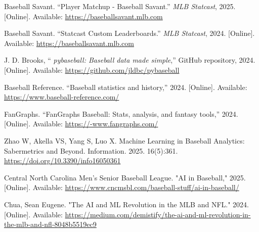 \documentclass[conference]{IEEEtran}
\begin{document}




\begin{thebibliography}{00}

 Baseball Savant. “Player Matchup - Baseball Savant.” \textit{MLB Statcast}, 2025. [Online]. Available: \url{https://baseballsavant.mlb.com}

 Baseball Savant. “Statcast Custom Leaderboards.” \textit{MLB Statcast}, 2024. [Online]. Available: \url{https://baseballsavant.mlb.com}

 J. D. Brooks, “
\textit{pybaseball: Baseball data made simple},” GitHub repository, 2024. [Online]. Available: 
\url{https://github.com/jldbc/pybaseball}

 Baseball Reference. “Baseball statistics and history,” 2024. [Online]. Available: \url{https://www.baseball-reference.com/}

 FanGraphs. “FanGraphs Baseball: Stats, analysis, and fantasy tools,” 2024. [Online]. Available: \url{https://-www.fangraphs.com/}

 Zhao W, Akella VS, Yang S, Luo X. Machine Learning in Baseball Analytics: Sabermetrics and Beyond. Information. 2025. 16(5):361. \url{https://doi.org/10.3390/info16050361}

 Central North Carolina Men's Senior Baseball League. "AI in Baseball," 2025. [Online]. Available: \url{https://www.cncmsbl.com/baseball-stuff/ai-in-baseball/}

 Chua, Sean Eugene. "The AI and ML Revolution in the MLB and NFL." 2024. [Online]. Available: \url{https://medium.com/demistify/the-ai-and-ml-revolution-in-the-mlb-and-nfl-8048b5519ec9}


\end{thebibliography}
\end{document}
